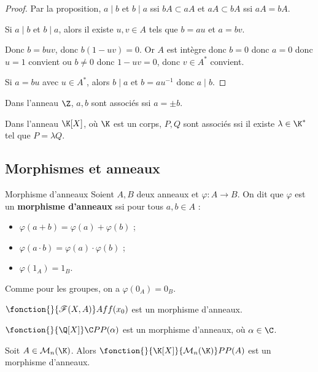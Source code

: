 \begin{proof}
    Par la proposition, $a \mid b$ et $b \mid a$ ssi $bA \subset aA$ et $aA \subset bA$ ssi 
    $aA = bA$.

    Si $a \mid b$ et $b \mid a$, alors il existe $u, v \in A$ tels que
    $b = au$ et $a = bv$. 

    Donc $b = buv$, donc $b(1 - uv) = 0$. Or $A$ est intègre donc 
    $b = 0$ donc $a = 0$ donc $u = 1$ convient ou $b \neq 0$ donc $1 - uv = 0$, donc $v \in A^*$ convient. 

    Si $a = bu$ avec $u \in A^*$, alors $b \mid a $ et $b = au^{-1}$ donc $a \mid b$.
\end{proof}

\begin{exemple}
    Dans l'anneau $\Z$, $a, b$ sont associés ssi $a = \pm b$.

    Dans l'anneau $\K[X]$, où $\K$ est un corps, $P, Q$ sont associés ssi
    il existe $\lambda \in \K^*$ tel que $P = \lambda Q$.
\end{exemple}

\subsection{Morphismes et anneaux}

\begin{definition}{Morphisme d'anneaux}{}
    Soient $A, B$ deux anneaux et $\varphi : A \to B$. On dit que $\varphi$ est un
    \textbf{morphisme d'anneaux} ssi pour tous $a, b \in A$ :
    \begin{itemize}
        \item $\varphi(a + b) = \varphi(a) + \varphi(b)$ ;
        \item $\varphi(a \cdot b) = \varphi(a) \cdot \varphi(b)$ ;
        \item $\varphi(1_A) = 1_B$.
    \end{itemize}
\end{definition}

\begin{remarque}
    Comme pour les groupes, on a $\varphi(0_A) = 0_B$.
\end{remarque}

\begin{exemple}
    $\fonction {}{\mathscr F(X, A)} A f {f(x_0)}$ est un morphisme d'anneaux. 

    \avspace 
    $\fonction {}{\Q [X]} \C P {P(\alpha)}$ est un morphisme d'anneaux, où $\alpha \in \C$.

    Soit $A \in \mathcal M_n(\K)$. Alors $\fonction {}{\K[X]}{\mathcal M_n(\K)} P {P(A)}$ est un morphisme d'anneaux.
\end{exemple}



